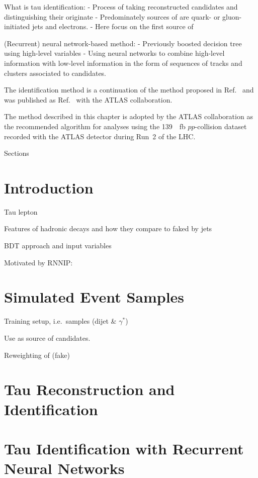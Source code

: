 What is tau identification:
- Process of taking reconstructed \tauhadvis candidates and distinguishing their originate
- Predominately sources of \faketauhadvis are quark- or gluon-initiated jets and electrons.
- Here focus on the first source of \faketauhadvis

(Recurrent) neural network-based method:
- Previously boosted decision tree using high-level variables
- Using neural networks to combine high-level information with
low-level information in the form of sequences of tracks and clusters
associated to \tauhadvis candidates.

The identification method is a continuation of the method proposed in
Ref.~\cite{cdeutsch-master} and was published as
Ref.~\cite{ATL-PHYS-PUB-2019-033} with the ATLAS collaboration.

The method described in this chapter is adopted by the ATLAS
collaboration as the recommended \tauid algorithm for analyses using
the \SI{139}{\per\femto\barn} $pp$-collision dataset recorded with the
ATLAS detector during Run~2 of the LHC.

Sections


\section{Introduction}

Tau lepton

Features of hadronic \tauhad decays and how they compare to \tauhad faked by jets

BDT approach and input variables


Motivated by RNNIP: \cite{ATL-PHYS-PUB-2017-003}


\section{Simulated Event Samples}

Training setup, i.e.\ samples (dijet \& $\gamma^*$)

Use as source of \tauhadvis candidates.

Reweighting of (fake) \tauhad \pT


\section{Tau Reconstruction and Identification}

\section{Tau Identification with Recurrent Neural Networks}

